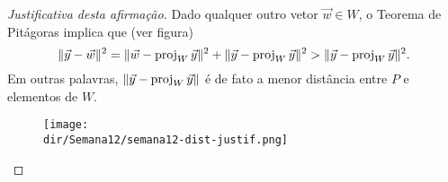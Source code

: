 \documentclass[../livro.tex]{subfiles}  %
\providecommand{\dir}{..}
\begin{document}
\begin{proof}[Justificativa desta afirmação]
Dado qualquer outro vetor $\vec{w} \in W$, o Teorema de Pitágoras implica que (ver figura)
\begin{equation}
\| \vec{y} - \vec{w} \|^2 = \| \vec{w} - \operatorname{proj}_{W} \vec{y}\|^2 + \| \vec{y} - \operatorname{proj}_{W} \vec{y}\|^2 > \| \vec{y} - \operatorname{proj}_{W} \vec{y}\|^2.
\end{equation} Em outras palavras, $\|\vec{y} - \operatorname{proj}_{W} \vec{y}\|$ é de fato a menor distância entre $P$ e elementos de $W$.
\begin{figure}[h!]
\begin{center}
\texttt{[image: \\dir/Semana12/semana12-dist-justif.png]}
\end{center}
\end{figure}
\end{proof}
\end{document}
